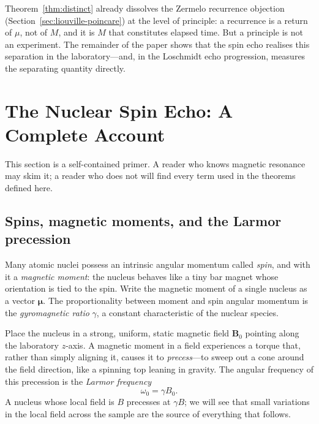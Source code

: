 \documentclass[11pt,a4paper]{article}
\theoremstyle{thmstyle}
\theoremstyle{definition}
\theoremstyle{remark}
\newcommand{\Mic}{\mu}
\newcommand{\Count}{M}
\newcommand{\Larmor}{\omega_{0}}
\begin{document}
Theorem~\ref{thm:distinct} already dissolves the Zermelo recurrence
objection (Section~\ref{sec:liouville-poincare}) at the level of
principle: a recurrence is a return of $\Mic$, not of $\Count$, and it is
$\Count$ that constitutes elapsed time. But a principle is not an
experiment. The remainder of the paper shows that the spin echo realises
this separation in the laboratory---and, in the Loschmidt echo
progression, measures the separating quantity directly.

\section{The Nuclear Spin Echo: A Complete Account}
\label{sec:nmr}

This section is a self-contained primer. A reader who knows magnetic
resonance may skim it; a reader who does not will find every term used in
the theorems defined here.

\subsection{Spins, magnetic moments, and the Larmor precession}
\label{sec:larmor}

Many atomic nuclei possess an intrinsic angular momentum called
\emph{spin}, and with it a \emph{magnetic moment}: the nucleus behaves
like a tiny bar magnet whose orientation is tied to the spin. Write the
magnetic moment of a single nucleus as a vector $\bm{\mu}$. The
proportionality between moment and spin angular momentum is the
\emph{gyromagnetic ratio} $\gamma$, a constant characteristic of the
nuclear species.

Place the nucleus in a strong, uniform, static magnetic field $\bm{B}_0$
pointing along the laboratory $z$-axis. A magnetic moment in a field
experiences a torque that, rather than simply aligning it, causes it to
\emph{precess}---to sweep out a cone around the field direction, like a
spinning top leaning in gravity. The angular frequency of this precession
is the \emph{Larmor frequency}
\begin{equation}
\Larmor = \gamma B_{0}.
\label{eq:larmor}
\end{equation}
A nucleus whose local field is $B$ precesses at $\gamma B$; we will see
that small variations in the local field across the sample are the source
of everything that follows.
\end{document}
